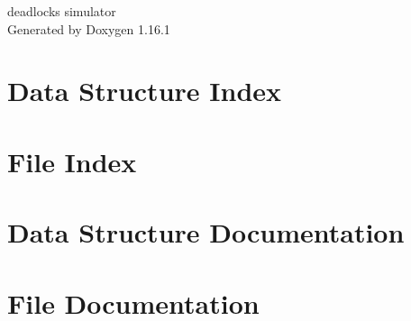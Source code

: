 \documentclass[twoside]{book}
\newcommand{\+}{\discretionary{\mbox{\scriptsize$\hookleftarrow$}}{}{}}
\newcommand{\clearemptydoublepage}{%
    \newpage{\pagestyle{empty}\cleardoublepage}%
  }
\begin{document}
  \raggedbottom
    \hypersetup{pageanchor=false,
                bookmarksnumbered=true,
                pdfencoding=unicode
               }
  \begin{titlepage}
  \vspace*{7cm}
  \begin{center}%
  {\Large deadlocks simulator}\\
  \vspace*{1cm}
  {\large Generated by Doxygen 1.16.1}\\
  \end{center}
  \end{titlepage}
  \clearemptydoublepage
  \tableofcontents
  \clearemptydoublepage
  \hypersetup{pageanchor=true}
\chapter{Data Structure Index}

\chapter{File Index}

\chapter{Data Structure Documentation}









\chapter{File Documentation}




















  \backmatter
  \newpage
  \clearemptydoublepage
  \printindex
\end{document}
